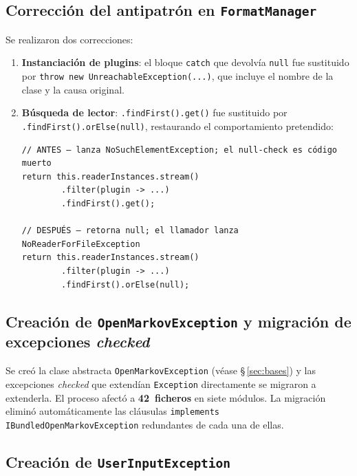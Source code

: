 \documentclass[12pt,a4paper]{article}
\begin{document}
\subsection{Corrección del antipatrón en \texttt{FormatManager}}
\label{sec:impl-formatmanager}

Se realizaron dos correcciones:

\begin{enumerate}
  \item \textbf{Instanciación de plugins}: el bloque \texttt{catch} que
    devolvía \texttt{null} fue sustituido por
    \texttt{throw new UnreachableException(...)}, que incluye el nombre de la
    clase y la causa original.

  \item \textbf{Búsqueda de lector}: \texttt{.findFirst().get()} fue sustituido
    por \texttt{.findFirst().orElse(null)}, restaurando el comportamiento
    pretendido:

\begin{lstlisting}[caption={Corrección en \texttt{getProbNetReaderInstanceFor()}}]
// ANTES — lanza NoSuchElementException; el null-check es código muerto
return this.readerInstances.stream()
        .filter(plugin -> ...)
        .findFirst().get();

// DESPUÉS — retorna null; el llamador lanza NoReaderForFileException
return this.readerInstances.stream()
        .filter(plugin -> ...)
        .findFirst().orElse(null);
\end{lstlisting}
\end{enumerate}

\subsection{Creación de \texttt{OpenMarkovException} y migración de excepciones
  \emph{checked}}
\label{sec:impl-base}

Se creó la clase abstracta \texttt{OpenMarkovException} (véase §\,\ref{sec:bases})
y las excepciones \emph{checked} que extendían \texttt{Exception} directamente
se migraron a extenderla. El proceso afectó a \textbf{42~ficheros} en siete
módulos. La migración eliminó automáticamente las cláusulas
\texttt{implements IBundledOpenMarkovException} redundantes de cada una de ellas.

\subsection{Creación de \texttt{UserInputException}}
\label{sec:impl-userinput}
\end{document}
